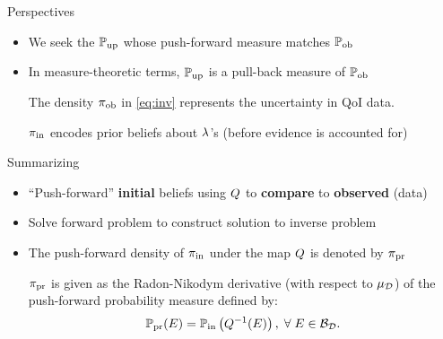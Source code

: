 \begin{frame}[t]{Perspectives}
\begin{itemize}
	\item We seek the $\operatorname*{\mathbb{P}_{up}}$ whose push-forward measure matches $\operatorname*{\mathbb{P}_{ob}}$
	\item In measure-theoretic terms, $\operatorname*{\mathbb{P}_{up}}$ is a pull-back measure of $\operatorname*{\mathbb{P}_{ob}}$

	\begin{defn}\label{defn:obsden}
		The density $\operatorname*{\pi_{ob}}$ in \eqref{eq:inv} represents the uncertainty in QoI data.
	\end{defn}

	\begin{defn}\label{defn:initialden}
		$\operatorname*{\pi_{in}}$ encodes prior beliefs about $\lambda$'s (before evidence is accounted for)
	\end{defn}

\end{itemize}

\end{frame}

\begin{frame}[t]{Summarizing}
\begin{itemize}
	\item ``Push-forward'' \textbf{initial} beliefs using $Q$ to \textbf{compare} to \textbf{observed} (data)
	\item Solve forward problem to construct solution to inverse problem
	\item The push-forward density of $\operatorname*{\pi_{in}}$ under the map $Q$ is denoted by $\operatorname*{\pi_{pr}}$

	\begin{defn}\label{defn:predicted}
		$\operatorname*{\pi_{pr}}$ is given as the Radon-Nikodym derivative (with respect to $\mu_{\mathcal{D}}$) of the push-forward probability measure defined by:
		\begin{equation}\label{eq:pred}
			\operatorname*{\mathbb{P}_{pr}} (E)  = \operatorname*{\mathbb{P}_{in}} \left ( Q^{-1}(E) \right ), \; \forall \; E \in \mathcal{B}_{\mathcal{D}}.
		\end{equation}
	\end{defn}

\end{itemize}

\end{frame}

